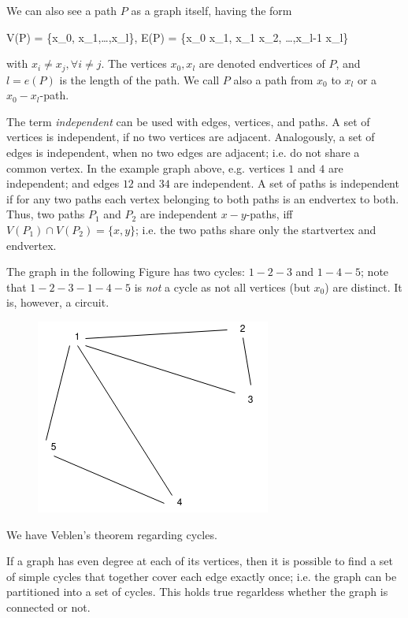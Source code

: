 We can also see a path $P$ as a graph itself, having the form

\bee
V(P) = \{x_0, x_1,\ldots,x_l\}, \quad E(P) = \{x_0 x_1, x_1 x_2, \ldots,x_{l-1} x_l\}
\eee

with $x_i \neq x_j, \forall i \neq j$. The vertices $x_0, x_l$ are denoted endvertices of $P$, and $l=e(P)$ is the length of the path. We call $P$ also a path from $x_0$ to $x_l$ or a $x_0 - x_l$-path.

The term \emph{independent} can be used with edges, vertices, and paths. A set of vertices is independent, if no two vertices are adjacent. Analogously, a set of edges is independent, when no two edges are adjacent; i.e. do not share a common vertex. In the example graph above, e.g. vertices $1$ and $4$ are independent; and edges $12$ and $34$ are independent. A set of paths is independent if for any two paths each vertex belonging to both paths is an endvertex to both. Thus, two paths $P_1$ and $P_2$ are independent $x-y$-paths, iff $V(P_1) \cap V(P_2) = \{x,y\}$; i.e. the two paths share only the startvertex and endvertex.

The graph in the following Figure has two cycles: $1-2-3$ and $1-4-5$; note that $1-2-3-1-4-5$ is \emph{not} a cycle as not all vertices (but $x_0$) are distinct. It is, however, a circuit.

\begin{figure}[H]
\centering
\includegraphics[scale=0.5]{images/graphs_03_02.png}
\end{figure}

We have Veblen's theorem regarding cycles.

\begin{theorem}
If a graph has even degree at each of its vertices, then it is possible to find a set of simple cycles that together cover each edge exactly once; i.e. the graph can be partitioned into a set of cycles. This holds true regarldess whether the graph is connected or not.
\end{theorem}


